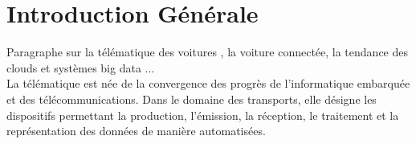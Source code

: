 \section{Introduction Générale}
    Paragraphe sur la télématique des voitures , la voiture connectée, 
    la tendance des clouds et systèmes big data ... \\
    


    La télématique est née de la convergence des progrès de l'informatique embarquée et 
    des télécommunications. Dans le domaine des transports, elle désigne les dispositifs 
    permettant la production, l'émission, la réception, le traitement et la représentation 
    des données de manière automatisées.

